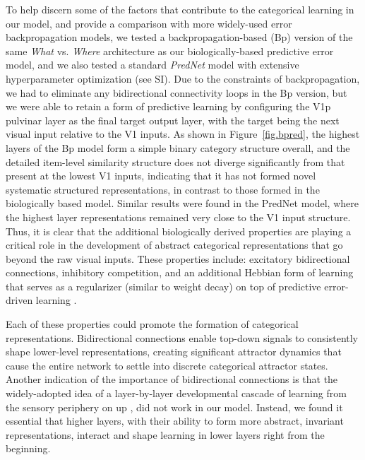 \documentclass[11pt,twoside]{article}
\newif\myifpdf
\begin{document}
To help discern some of the factors that contribute to the categorical learning in our model, and provide a comparison with more widely-used error backpropagation models, we tested a backpropagation-based (Bp) version of the same \emph{What} vs. \emph{Where} architecture as our biologically-based predictive error model, and we also tested a standard \emph{PredNet} model \citep{LotterKreimanCox16} with extensive hyperparameter optimization (see SI).  Due to the constraints of backpropagation, we had to eliminate any bidirectional connectivity loops in the Bp version, but we were able to retain a form of predictive learning by configuring the V1p pulvinar layer as the final target output layer, with the target being the next visual input relative to the V1 inputs.  As shown in Figure~\ref{fig.bpred}, the highest layers of the Bp model form a simple binary category structure overall, and the detailed item-level similarity structure does not diverge significantly from that present at the lowest V1 inputs, indicating that it has not formed novel systematic structured representations, in contrast to those formed in the biologically based model.  Similar results were found in the PredNet model, where the highest layer representations remained very close to the V1 input structure.  Thus, it is clear that the additional biologically derived properties are playing a critical role in the development of abstract categorical representations that go beyond the raw visual inputs. These properties include: excitatory bidirectional connections, inhibitory competition, and an additional Hebbian form of learning that serves as a regularizer (similar to weight decay) on top of predictive error-driven learning \citep{OReilly98,OReillyMunakata00}.

Each of these properties could promote the formation of categorical representations. Bidirectional connections enable top-down signals to consistently shape lower-level representations, creating significant attractor dynamics that cause the entire network to settle into discrete categorical attractor states.  Another indication of the importance of bidirectional connections is that the widely-adopted idea of a layer-by-layer developmental cascade of learning from the sensory periphery on up \citep{ShragerJohnson96,BengioYaoAlainEtAl13,Valpola14,HintonSalakhutdinov06}, did not work in our model. Instead, we found it essential that higher layers, with their ability to form more abstract, invariant representations, interact and shape learning in lower layers right from the beginning.
\end{document}
